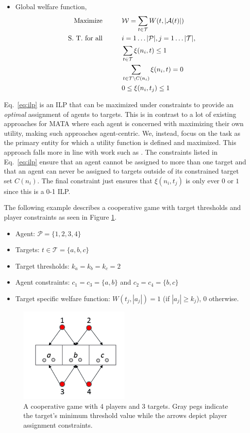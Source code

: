 \documentclass[12pt]{book}
\newcommand{\Pl}{\mathcal{P}} %
\newcommand{\Ta}{\mathcal{T}} %
\newcommand{\We}{\mathcal{W}} %
\begin{document}
\begin{itemize}
	\item Global welfare function,
\begin{align}\label{eq:ilp}
	\text{Maximize}\hspace{1cm} & \We = \sum\limits_{t \in \Ta} W(t, |\mathcal{A}(t)|)\\
	\text{S. T. for all}\hspace{1cm} & i = 1\ldots|\Pl|, j = 1\ldots|\Ta|,\notag\\
	& \sum\limits_{t \in \Ta} \xi(n_i, t) \leq 1\notag\\
	& \sum\limits_{t \in \Ta \backslash C(n_i)} \xi(n_i, t) = 0\notag\\
	& 0 \leq \xi(n_i, t_j) \leq 1\notag	
\end{align}
\end{itemize}

Eq.~\eqref{eq:ilp} is an ILP that can be maximized under constraints to provide an \emph{optimal} assignment of agents to targets. This is in contrast to a lot of existing approaches for MATA where each agent is concerned with maximizing their own utility, making such approaches agent-centric. We, instead, focus on the task as the primary entity for which a utility function is defined and maximized. This approach falls more in line with work such as \cite{shehory1998methods}. The constraints listed in Eq.~\eqref{eq:ilp} ensure that an agent cannot be assigned to more than one target and that an agent can never be assigned to targets outside of its constrained target set $C(n_i)$. The final constraint just ensures that $\xi(n_i, t_j)$ is only ever $0$ or $1$ since this is a 0-1 ILP.

The following example describes a cooperative game with target thresholds and player constraints as seen in Figure \ref{fig:ex1}.
\begin{itemize}
	\item Agent: $\Pl = \{1,2,3,4\}$
	\item Targets: $t \in \Ta = \{a, b, c\}$
	\item Target thresholds: $k_a = k_b = k_c = 2$
	\item Agent constraints: $c_1 = c_3 = \{a, b\}$ and $c_2 = c_4 = \{b, c\}$
	\item Target specific welfare function: $W(t_j, |a_j|) = 1$ (if $|a_j| \geq k_j$), $0$ otherwise.
	
\end{itemize}
\begin{figure}[!htb]
	\centering\includegraphics[width=5.5cm]{../assets/ex1.png}
	\centering\caption{A cooperative game with 4 players and 3 targets. Gray pegs indicate the target's minimum threshold value while the arrows depict player assignment constraints.}\label{fig:ex1}
\end{figure}
\end{document}

